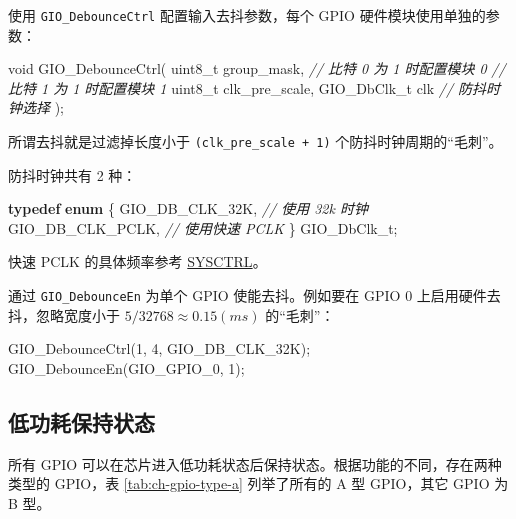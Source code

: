 \documentclass[
  12pt,
]{book}
\newenvironment{Shaded}{\begin{snugshade}}{\end{snugshade}}
\newcommand{\CommentTok}[1]{\textcolor[rgb]{0.56,0.35,0.01}{\textit{#1}}}
\newcommand{\DataTypeTok}[1]{\textcolor[rgb]{0.13,0.29,0.53}{#1}}
\newcommand{\DecValTok}[1]{\textcolor[rgb]{0.00,0.00,0.81}{#1}}
\newcommand{\KeywordTok}[1]{\textcolor[rgb]{0.13,0.29,0.53}{\textbf{#1}}}
\newcommand{\NormalTok}[1]{#1}
\begin{document}
使用 \texttt{GIO\_DebounceCtrl} 配置输入去抖参数，每个 GPIO 硬件模块使用单独的参数：

\begin{Shaded}
\begin{Highlighting}[]
\DataTypeTok{void}\NormalTok{ GIO_DebounceCtrl(}
  \DataTypeTok{uint8_t}\NormalTok{ group_mask,     }\CommentTok{// 比特 0 为 1 时配置模块 0}
                          \CommentTok{// 比特 1 为 1 时配置模块 1}
  \DataTypeTok{uint8_t}\NormalTok{ clk_pre_scale,}
\NormalTok{  GIO_DbClk_t clk         }\CommentTok{// 防抖时钟选择}
\NormalTok{  );}
\end{Highlighting}
\end{Shaded}

所谓去抖就是过滤掉长度小于 \texttt{(clk\_pre\_scale\ +\ 1)} 个防抖时钟周期的``毛刺''。

防抖时钟共有 2 种：

\begin{Shaded}
\begin{Highlighting}[]
\KeywordTok{typedef} \KeywordTok{enum}
\NormalTok{\{}
\NormalTok{    GIO_DB_CLK_32K,     }\CommentTok{// 使用 32k 时钟}
\NormalTok{    GIO_DB_CLK_PCLK,    }\CommentTok{// 使用快速 PCLK}
\NormalTok{\} GIO_DbClk_t;}
\end{Highlighting}
\end{Shaded}

快速 PCLK 的具体频率参考 \protect\hyperlink{ch-sysctrl}{SYSCTRL}。

通过 \texttt{GIO\_DebounceEn} 为单个 GPIO 使能去抖。例如要在 GPIO 0 上启用硬件去抖，忽略宽度小于
\(5/32768 \approx 0.15 (ms)\) 的``毛刺''：

\begin{Shaded}
\begin{Highlighting}[]
\NormalTok{GIO_DebounceCtrl(}\DecValTok{1}\NormalTok{, }\DecValTok{4}\NormalTok{, GIO_DB_CLK_32K);}
\NormalTok{GIO_DebounceEn(GIO_GPIO_0, }\DecValTok{1}\NormalTok{);}
\end{Highlighting}
\end{Shaded}

\hypertarget{ux4f4eux529fux8017ux4fddux6301ux72b6ux6001}{%
\subsection{低功耗保持状态}\label{ux4f4eux529fux8017ux4fddux6301ux72b6ux6001}}

所有 GPIO 可以在芯片进入低功耗状态后保持状态。根据功能的不同，存在两种类型的 GPIO，表 \ref{tab:ch-gpio-type-a}
列举了所有的 A 型 GPIO，其它 GPIO 为 B 型。
\end{document}
